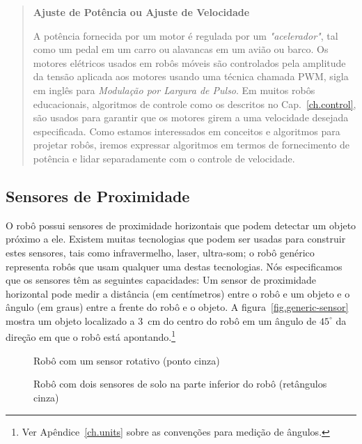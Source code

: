 \begin{quote}
\begin{center}
\textbf{Ajuste de Potência ou Ajuste de Velocidade}
\end{center}
A potência fornecida por um motor é regulada por um \emph{"acelerador"}, tal como um pedal em um carro ou alavancas em um avião ou barco. Os motores elétricos usados em robôs móveis são controlados pela amplitude da tensão aplicada aos motores usando uma técnica chamada PWM, sigla em inglês para \emph{Modulação por Largura de Pulso}. Em muitos robôs educacionais, algoritmos de controle como os descritos no Cap.~\ref{ch.control}, são usados para garantir que os motores girem a uma velocidade {desejada especificada}. Como estamos interessados em conceitos e algoritmos para projetar robôs, iremos expressar algoritmos em termos de fornecimento de potência e lidar separadamente com o controle de velocidade.
\end{quote}

\subsection{Sensores de Proximidade}

O robô possui sensores de proximidade horizontais que podem detectar um objeto próximo a ele. Existem muitas tecnologias que podem ser usadas para construir estes sensores, tais como infravermelho, laser, ultra-som; o robô genérico representa robôs que usam qualquer uma destas tecnologias. Nós especificamos que os sensores têm as seguintes capacidades: Um sensor de proximidade horizontal pode medir a distância (em centímetros) entre o robô e um objeto e o ângulo (em graus) entre a frente do robô e o objeto. A figura~\ref{fig.generic-sensor} mostra um objeto localizado a $3\,$ cm do centro do robô em um ângulo de $45^{\circ}$ da direção em que o robô está apontando.\footnote{Ver Apêndice~\ref{ch.units} sobre as convenções para medição de ângulos.}

\begin{figure}
\begin{minipage}{.45\textwidth}
\caption{Robô com um sensor rotativo (ponto cinza)}
\label{fig.generic-sensor}
\end{minipage}
\hspace{\fill}
\begin{minipage}{.45\textwidth}
\caption{Robô com dois sensores de solo na parte inferior do robô (retângulos cinza)}
\label{fig.generic-ground}
\end{minipage}
\end{figure}

